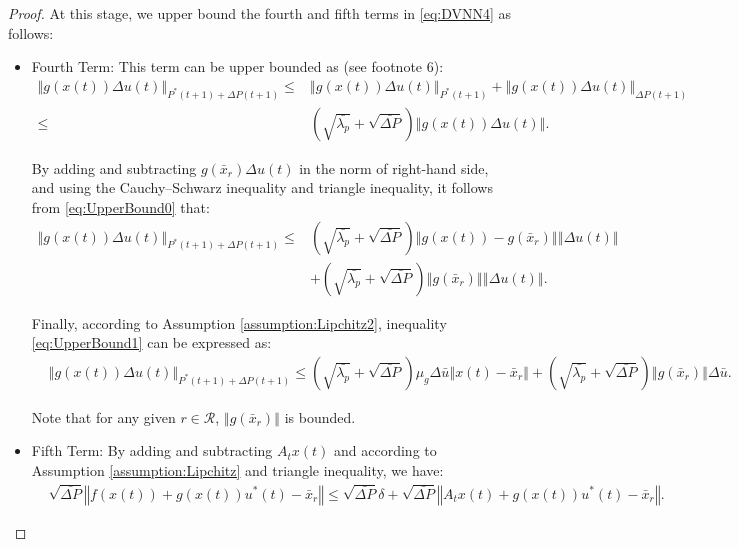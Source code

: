 \documentclass[1p,times]{elsarticle}
\begin{document}
\begin{proof}
At this stage, we upper bound the fourth and fifth terms in \eqref{eq:DVNN4} as follows:
\begin{itemize}
\item Fourth Term: This term can be upper bounded as (see footnote 6):
\begin{align}
\left\Vert g\left(x(t)\right)\Delta{u(t)}\right\Vert_{P^\ast(t+1)+\Delta{P(t+1)}}\leq&\left\Vert g\left(x(t)\right)\Delta{u(t)}\right\Vert_{P^\ast(t+1)}+\left\Vert g\left(x(t)\right)\Delta{u(t)}\right\Vert_{\Delta{P(t+1)}}\nonumber\\
\leq&\left(\sqrt{\bar{\lambda_p}}+\sqrt{\bar{\Delta{P}}}\right)\left\Vert g\left(x(t)\right)\Delta{u(t)}\right\Vert.\label{eq:UpperBound0}
\end{align}
    
By adding and subtracting $g\left(\bar{x}_r\right)\Delta{u(t)}$ in the norm of right-hand side, and using the Cauchy–Schwarz inequality and triangle inequality, it follows from \eqref{eq:UpperBound0} that:
\begin{align}
 \left\Vert g\left(x(t)\right)\Delta{u(t)}\right\Vert_{P^\ast(t+1)+\Delta{P(t+1)}}\leq&(\sqrt{\bar{\lambda_p}}+\sqrt{\bar{\Delta{P}}})\left\Vert g\left(x(t)\right)-g(\bar{x}_r)\right\Vert\left\Vert\Delta{u(t)}\right\Vert\nonumber\\
&+(\sqrt{\bar{\lambda_p}}+\sqrt{\bar{\Delta{P}}})\left\Vert g(\bar{x}_r)\right\Vert\left\Vert\Delta{u(t)}\right\Vert.\label{eq:UpperBound1}
\end{align}

Finally, according to Assumption \ref{assumption:Lipchitz2}, inequality \ref{eq:UpperBound1} can be expressed as:
\begin{align}
& \left\Vert g\left(x(t)\right)\Delta{u(t)}\right\Vert_{P^\ast(t+1)+\Delta{P(t+1)}}\leq(\sqrt{\bar{\lambda_p}}+\sqrt{\bar{\Delta{P}}})\mu_g\Delta\bar{u}\left\Vert x(t)-\bar{x}_r\right\Vert+(\sqrt{\bar{\lambda_p}}+\sqrt{\bar{\Delta{P}}})\left\Vert g(\bar{x}_r)\right\Vert\Delta\bar{u}.\label{eq:UpperBound2}
\end{align}

Note that for any given $r\in\mathcal{R}$, $\left\Vert g(\bar{x}_r)\right\Vert$ is bounded. 

    
\item Fifth Term: By adding and subtracting $A_tx(t)$ and according to Assumption \ref{assumption:Lipchitz} and triangle inequality, we have:
\begin{align}
&\sqrt{\bar{\Delta{P}}}\left\Vert f\left(x(t)\right)+g\left(x(t)\right)u^\ast(t)-\bar{x}_r\right\Vert\leq\sqrt{\bar{\Delta{P}}}\delta+\sqrt{\bar{\Delta{P}}}\left\Vert A_tx(t)+g\left(x(t)\right)u^\ast(t)-\bar{x}_r\right\Vert.
\end{align}



\end{itemize}
\end{proof}
\end{document}
